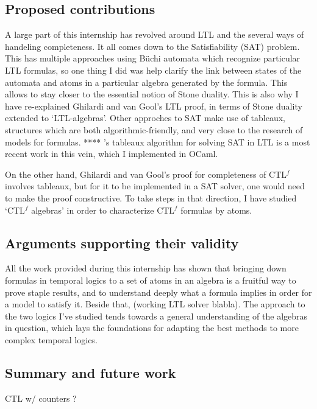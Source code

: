 \documentclass[11pt]{article}
\newcommand{\CTLf}{{CTL$^f$ }}
\begin{document}
\subsection*{Proposed contributions}
A large part of this internship has revolved around LTL and the several
ways of handeling completeness. It all comes down to the Satisfiability 
(SAT) problem. This has multiple approaches using Büchi automata which
recognize particular LTL formulas, 
so one thing I did was help clarify the link between states of the 
automata and atoms in a particular algebra generated by the formula.
This allows to stay closer to the essential notion of Stone duality.
This is also why I have re-explained Ghilardi and van Gool's LTL proof,
in terms of Stone duality extended to `LTL-algebras'. Other approches 
to SAT make use of tableaux, structures which are both algorithmic-friendly,
and very close to the research of models for formulas. **** 's tableaux
algorithm for solving SAT in LTL is a most recent work in this vein,
which I implemented in OCaml. 

On the other hand, Ghilardi and van Gool's proof for completeness of \CTLf
involves tableaux, but for it to be implemented in a SAT solver, one
would need to make the proof constructive. To take steps in that
direction, I have studied `\CTLf algebras' in order to characterize
\CTLf formulas by atoms.


\subsection*{Arguments supporting their validity}
All the work provided during this internship has shown that bringing down
formulas in temporal logics to a set of atoms in an algebra is a fruitful
way to prove staple results, and to understand deeply what a formula
implies in order for a model to satisfy it. Beside that, (working LTL solver
blabla). The approach to the two logics I've studied tends towards a general
understanding of the algebras in question, which lays the foundations for
adapting the best methods to more complex temporal logics.



\subsection*{Summary and future work}
CTL w/ counters ?
\end{document}
